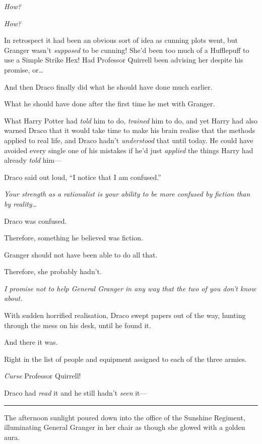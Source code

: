 \emph{How?}

\emph{How?}

In retrospect it had been an obvious sort of idea as cunning plots went,
but Granger wasn't \emph{supposed} to be cunning! She'd been too much of
a Hufflepuff to use a Simple Strike Hex! Had Professor Quirrell been
advising her despite his promise, or\ldots{}

And then Draco finally did what he should have done much earlier.

What he should have done after the first time he met with Granger.

What Harry Potter had \emph{told} him to do, \emph{trained} him to do,
and yet Harry had also warned Draco that it would take time to make his
brain realise that the methods applied to real life, and Draco hadn't
\emph{understood} that until today. He could have avoided every single
one of his mistakes if he'd just \emph{applied} the things Harry had
already \emph{told} him---

Draco said out loud, ``I notice that I am confused.''

\emph{Your strength as a rationalist is your ability to be more confused
by fiction than by reality\ldots{}}

Draco was confused.

Therefore, something he believed was fiction.

Granger should not have been able to do all that.

Therefore, she probably hadn't.

\emph{I promise not to help General Granger in any way that the two of
you don't know about.}

With sudden horrified realisation, Draco swept papers out of the way,
hunting through the mess on his desk, until he found it.

And there it was.

Right in the list of people and equipment assigned to each of the three
armies.

\emph{Curse} Professor Quirrell!

Draco had \emph{read} it and he still hadn't \emph{seen} it---

\begin{center}\rule{3in}{0.4pt}\end{center}

The afternoon sunlight poured down into the office of the Sunshine
Regiment, illuminating General Granger in her chair as though she glowed
with a golden aura.


